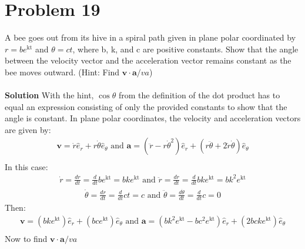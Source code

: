 \documentclass[]{article}
\newcommand{\bd}{\textbf}
\newcommand{\ehr}{\hat{e}_r}
\newcommand{\ehth}{\hat{e}_\theta}
\begin{document}
\section{Problem 19}
A bee goes out from its hive in a spiral path given in plane polar coordinated by $ r = be^\text{kt} $ and $ \theta = ct $, where b, k, and c are positive constants. Show that the angle between the velocity vector and the acceleration vector remains constant as the bee moves outward. (Hint: Find $ \bd{v} \cdot \bd{a} / va $)
\\\\
\bd{Solution} With the hint, $ \cos \theta $ from the definition of the dot product has to equal an expression consisting of only the provided constants to show that the angle is constant. In plane polar coordinates, the velocity and acceleration vectors are given by:
\begin{equation}
\begin{split}
\bd{v} = \dot{r}\ehr + r\dot{\theta}\ehth \text{ and } \bd{a} = (\ddot{r} - r\dot{\theta}^2)\ehr + (r\ddot{\theta} + 2\dot{r}\dot{\theta})\ehth \\
\end{split}
\end{equation}
In this case:
\begin{equation}
\begin{split}
\dot{r} = \frac{dr}{dt} = \frac{d}{dt}be^\text{kt} = bke^\text{kt} \text{ and } \ddot{r} = \frac{d\dot{r}}{dt} = \frac{d}{dt}bke^\text{kt} = bk^2e^\text{kt}
\end{split}
\end{equation}
\begin{equation}
\begin{split}
\dot{\theta} = \frac{dr}{dt} = \frac{d}{dt}ct = c \text{ and } \ddot{\theta} = \frac{d\dot{\theta}}{dt} = \frac{d}{dt}c = 0
\end{split}
\end{equation}
Then:
\begin{equation}
\begin{split}
\bd{v} = (bke^\text{kt})\ehr + (bce^\text{kt})\ehth \text{ and } \bd{a} = (bk^2e^\text{kt} - bc^2e^\text{kt})\ehr + (2bcke^\text{kt})\ehth \\
\end{split}
\end{equation}
Now to find $ \bd{v} \cdot \bd{a} / va $
\\\\
\end{document}
